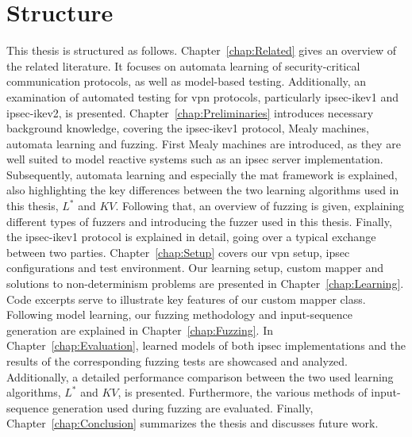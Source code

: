 \section{Structure}
This thesis is structured as follows. Chapter~\ref{chap:Related} gives an overview of the related literature. It focuses on automata learning of security-critical communication protocols, as well as model-based testing. Additionally, an examination of automated testing for \ac{vpn} protocols, particularly \ac{ipsec}-\ac{ike}v1 and \ac{ipsec}-\ac{ike}v2, is presented. Chapter~\ref{chap:Preliminaries} introduces necessary background knowledge, covering the \ac{ipsec}-\ac{ike}v1 protocol, Mealy machines, automata learning and fuzzing. First Mealy machines are introduced, as they are well suited to model reactive systems such as an \ac{ipsec} server implementation. Subsequently, automata learning and especially the \ac{mat} framework is explained, also highlighting the key differences between the two learning algorithms used in this thesis, $L^*$ and $KV$. Following that, an overview of fuzzing is given, explaining different types of fuzzers and introducing the fuzzer used in this thesis. Finally, the \ac{ipsec}-\ac{ike}v1 protocol is explained in detail, going over a typical exchange between two parties. Chapter~\ref{chap:Setup} covers our \ac{vpn} setup, \ac{ipsec} configurations and test environment. Our learning setup, custom mapper and solutions to non-determinism problems are presented in Chapter~\ref{chap:Learning}. Code excerpts serve to illustrate key features of our custom mapper class. Following model learning, our fuzzing methodology and input-sequence generation are explained in Chapter~\ref{chap:Fuzzing}.  In Chapter~\ref{chap:Evaluation}, learned models of both \ac{ipsec} implementations and the results of the corresponding fuzzing tests are showcased and analyzed. Additionally, a detailed performance comparison between the two used learning algorithms, $L^*$ and $KV$, is presented. Furthermore, the various methods of input-sequence generation used during fuzzing are evaluated.
Finally, Chapter~\ref{chap:Conclusion} summarizes the thesis and discusses future work.